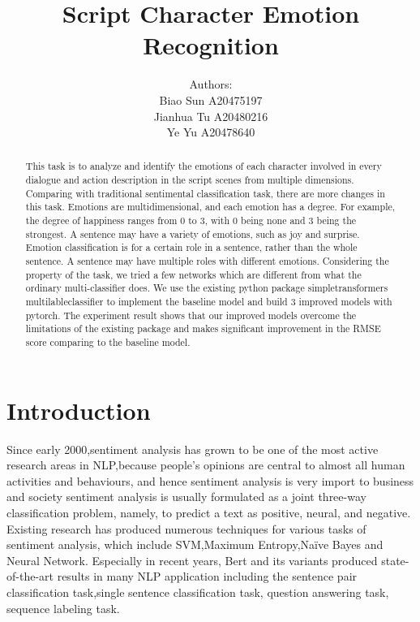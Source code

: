 \documentclass[12pt,twocolumn,letterpaper]{article}
\begin{document}
\title{Script Character Emotion Recognition}

\author{Authors:\\
Biao Sun A20475197\\
Jianhua Tu A20480216\\
Ye Yu A20478640\\

}

\maketitle

\begin{abstract}
This task is to analyze and identify the emotions of each character involved in every dialogue and action description in the script scenes from multiple dimensions. Comparing with traditional sentimental classification task, there are more changes in this task. Emotions are multidimensional, and each emotion has a degree. For example, the degree of happiness ranges from 0 to 3, with 0 being none and 3 being the strongest. A sentence may have a variety of emotions, such as joy and surprise. Emotion classification is for a certain role in a sentence, rather than the whole sentence. A sentence may have multiple roles with different emotions. Considering the property of the task, we tried a few networks which are different from what the ordinary multi-classifier does. We use the existing python package simpletransformers multilableclassifier to implement the baseline model and build 3 improved models with pytorch. The experiment result shows that our improved models overcome the limitations of the existing package and makes significant improvement in the RMSE score comparing to the baseline model.
\end{abstract}

\section{Introduction}
Since early 2000,sentiment analysis has grown to be one of the most active research areas in NLP,because people’s opinions are central to almost all human activities and behaviours, and hence sentiment analysis is very import to business and society 
sentiment analysis is usually formulated as a joint three-way classification problem, namely, to predict a text as positive, neural, and negative.
Existing research has produced numerous techniques for various tasks of sentiment analysis, which include SVM,Maximum Entropy,Naïve Bayes and Neural Network. Especially in recent years, Bert and its variants produced state-of-the-art results in many NLP application including the sentence pair classification task,single sentence classification task, question answering task, sequence labeling task.
\end{document}
